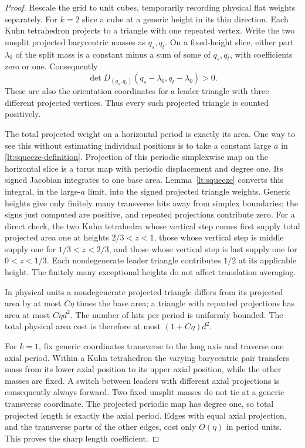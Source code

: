 \documentclass[11pt]{article}
\numberwithin{equation}{section}
\theoremstyle{definition}
\theoremstyle{remark}
\begin{document}
\begin{proof}
Rescale the grid to unit cubes, temporarily recording physical
flat weights separately.  For $k=2$ slice a cube at a generic
height in its thin direction.  Each Kuhn tetrahedron projects to
a triangle with one repeated vertex.  Write the two unsplit
projected barycentric masses as $q_s,q_t$.  On a fixed-height
slice, either part $\lambda_0$ of the split mass is a constant
minus a sum of some of $q_s,q_t$, with coefficients zero or one.
Consequently
\[
 \det D_{(q_s,q_t)}(q_s-\lambda_0,q_t-\lambda_0)>0.
\]
These are also the orientation coordinates for a leader triangle
with three different projected vertices.  Thus every such
projected triangle is counted positively.

The total projected weight on a horizontal period is exactly
its area.  One way to see this without estimating individual
positions is to take a constant large $a$ in
\eqref{lt:squeeze-definition}.  Projection of this periodic
simplexwise map on the horizontal slice is a torus map with
periodic displacement and degree one.  Its signed Jacobian
integrates to one base area.  Lemma~\ref{lt:squeeze} converts
this integral, in the large-$a$ limit, into the signed projected
triangle weights.  Generic heights give only finitely many
transverse hits away from simplex boundaries; the signs just
computed are positive, and repeated projections contribute zero.
For a direct check, the two Kuhn tetrahedra whose vertical step
comes first supply total projected area one at heights
$2/3<z<1$, those whose vertical step is middle supply one for
$1/3<z<2/3$, and those whose vertical step is last supply one for
$0<z<1/3$.  Each nondegenerate leader triangle contributes $1/2$
at its applicable height.  The finitely many exceptional heights
do not affect translation averaging.

In physical units a nondegenerate projected triangle differs
from its projected area by at most $C\eta$ times the base area;
a triangle with repeated projections has area at most
$C\eta d^2$.  The number of hits per period is uniformly bounded.
The total physical area cost is therefore at most
$(1+C\eta)d^2$.

For $k=1$, fix generic coordinates transverse to the long axis
and traverse one axial period.  Within a Kuhn tetrahedron the
varying barycentric pair transfers mass from its lower axial
position to its upper axial position, while the other masses
are fixed.  A switch between leaders with different axial
projections is consequently always forward.  Two fixed
unsplit masses do not tie at a generic transverse coordinate.
The projected periodic map has degree one, so total projected
length is exactly the axial period.  Edges with equal axial
projection, and the transverse parts of the other edges, cost
only $O(\eta)$ in period units.  This proves the sharp length
coefficient.


\end{proof}
\end{document}
